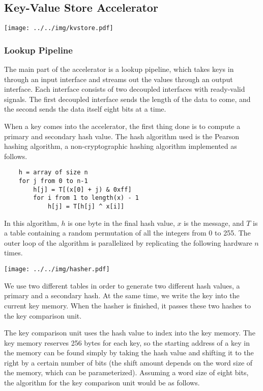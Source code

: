 \subsection{Key-Value Store Accelerator}

\begin{center}
\texttt{[image: ../../img/kvstore.pdf]}
\end{center}

\subsubsection{Lookup Pipeline}

The main part of the accelerator is a lookup pipeline, which takes keys in
through an input interface and streams out the values through an output
interface. Each interface consists of two decoupled interfaces with ready-valid
signals. The first decoupled interface sends the length of the data to come,
and the second sends the data itself eight bits at a time.

When a key comes into the accelerator, the first thing done is to compute a
primary and secondary hash value. The hash algorithm used is the Pearson
hashing algorithm, a non-cryptographic hashing algorithm implemented as follows.

\begin{verbatim}
    h = array of size n
    for j from 0 to n-1
        h[j] = T[(x[0] + j) & 0xff]
        for i from 1 to length(x) - 1
            h[j] = T[h[j] ^ x[i]]
\end{verbatim}

In this algorithm, \(h\) is one byte in the final hash value,
\(x\) is the message, and \(T\) is a table containing a random permutation of
all the integers from 0 to 255. The outer loop of the algorithm is
parallelized by replicating the following hardware \(n\) times.

\texttt{[image: ../../img/hasher.pdf]}

We use two different tables in order to generate two different hash values,
a primary and a secondary hash. At the same time, we write the key into the
current key memory. When the hasher is finished, it passes these two hashes
to the key comparison unit.

The key comparison unit uses the hash value to index into the key memory.
The key memory reserves 256 bytes for each key, so the starting address of a
key in the memory can be found simply by taking the hash value and shifting it
to the right by a certain number of bits (the shift amount depends on the
word size of the memory, which can be parameterized). Assuming a word size
of eight bits, the algorithm for the key comparison unit would be as follows.

